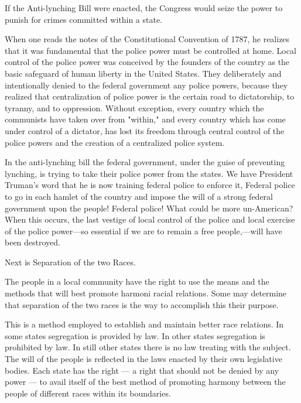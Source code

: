\documentclass[10pt,a4paper]{article}
\begin{document}
If the Anti-lynching Bill were enacted, the Congress would seize the power to punish for crimes committed within a state.

When one reads the notes of the Constitutional Convention of 1787, he realizes that it was fundamental that the police power must be controlled at home. Local control of the police power was conceived by the founders of the country as the basic safeguard of human liberty in the United States. They deliberately and intentionally denied to the federal government any police powers, because they realized that centralization of police power is the certain road to dictatorship, to tyranny, and to oppression. Without exception, every country which the communists have taken over from "within," and every country which has come under control of a dictator, has lost its freedom through central control of the police powers and the creation of a centralized police system.

In the anti-lynching bill the federal government, under the guise of preventing lynching, is trying to take their police power from the states. We have President Truman's word that he is now training federal police to enforce it, Federal police to go in each hamlet of the country and impose the will of a strong federal government upon the people! Federal police! What could be more un-American? When this occurs, the last vestige of local control of the police and local exercise of the police power—so essential if we are to remain a free people,—will have been destroyed.

Next is Separation of the two Races.

The people in a local community have the right to use the means and the methods that will best promote harmoni racial relations. Some may determine that separation of the two races is the way to accomplish this their purpose.

This is a method employed to establish and maintain better race relations. In some states segregation is provided by law. In other states segregation is prohibited by law. In still other states there is no law treating with the subject. The will of the people is reflected in the laws enacted by their own legislative bodies. Each state has the right — a right that should not be denied by any power — to avail itself of the best method of promoting harmony between the people of different races within its boundaries.
\end{document}
